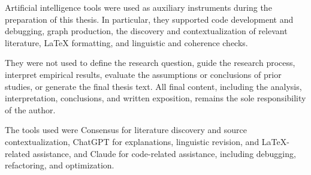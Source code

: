 

Artificial intelligence tools were used as auxiliary instruments during the
preparation of this thesis. In particular, they supported code development and
debugging, graph production, the discovery and contextualization of relevant
literature, LaTeX formatting, and linguistic and coherence checks.

They were not used to define the research question, guide the research process,
interpret empirical results, evaluate the assumptions or conclusions of prior
studies, or generate the final thesis text. All final content, including the
analysis, interpretation, conclusions, and written exposition, remains the sole
responsibility of the author.

The tools used were Consensus for literature discovery and source
contextualization, ChatGPT for explanations, linguistic revision, and
LaTeX-related assistance, and Claude for code-related assistance, including
debugging, refactoring, and optimization.